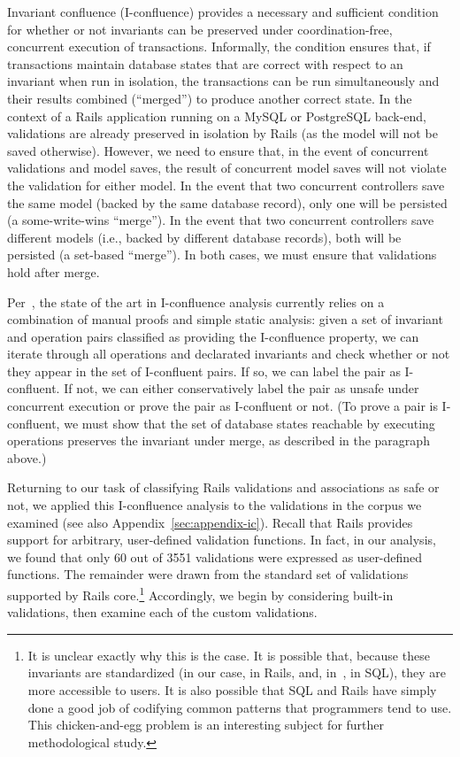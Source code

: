 Invariant confluence (I-confluence) provides a necessary and
sufficient condition for whether or not invariants can be preserved
under coordination-free, concurrent execution of
transactions. Informally, the condition ensures that, if transactions
maintain database states that are correct with respect to an invariant
when run in isolation, the transactions can be run simultaneously and
their results combined (``merged'') to produce another correct
state. In the context of a Rails application running on a MySQL or
PostgreSQL back-end, validations are already preserved in isolation by
Rails (as the model will not be saved otherwise). However, we need to
ensure that, in the event of concurrent validations and model saves,
the result of concurrent model saves will not violate the validation
for either model. In the event that two concurrent controllers save
the same model (backed by the same database record), only one will be
persisted (a some-write-wins ``merge''). In the event that two
concurrent controllers save different models (i.e., backed by
different database records), both will be persisted (a set-based
``merge''). In both cases, we must ensure that validations hold after
merge.

Per~\cite{coord-avoid}, the state of the art in I-confluence
analysis currently relies on a combination of manual proofs and simple
static analysis: given a set of invariant and operation pairs
classified as providing the I-confluence property, we can
iterate through all operations and declarated invariants and check
whether or not they appear in the set of I-confluent pairs. If
so, we can label the pair as I-confluent. If not, we can
either conservatively label the pair as unsafe under concurrent
execution or prove the pair as I-confluent or not. (To prove a
pair is I-confluent, we must show that the set of database
states reachable by executing operations preserves the invariant under
merge, as described in the paragraph above.)

Returning to our task of classifying Rails validations and
associations as safe or not, we applied this I-confluence analysis to
the validations in the corpus we examined (see also
Appendix~\ref{sec:appendix-ic}). Recall that Rails provides
support for arbitrary, user-defined validation functions. In fact, in
our analysis, we found that only 60 out of 3551 validations were
expressed as user-defined functions. The remainder were drawn from the
standard set of validations supported by Rails core.\footnote{It is
  unclear exactly why this is the case. It is possible that, because
  these invariants are standardized (in our case, in Rails, and,
  in~\cite{coord-avoid}, in SQL), they are more accessible to
  users. It is also possible that SQL and Rails have simply done a
  good job of codifying common patterns that programmers tend to
  use. This chicken-and-egg problem is an interesting subject for
  further methodological study.} Accordingly, we begin by considering
built-in validations, then examine each of the custom validations.

